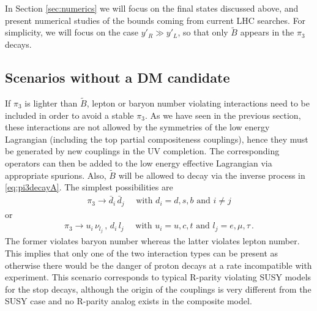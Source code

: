\documentclass[preprintnumbers,nofootinbib,showpacs,eqsecnum,pre,12pt]{revtex4-1}
\begin{document}
In Section \ref{sec:numerics} we will focus on the final states discussed above, and present numerical studies of the bounds coming from current LHC searches. For simplicity, we will focus on the case $y'_R \gg y'_L$, so that only $\tilde{B}$ appears in the $\pi_3$ decays.





\subsection{Scenarios without a DM candidate} 

If $\pi_3$ is lighter than $\tilde{B}$, lepton or baryon number violating interactions need to be included in order to avoid a stable $\pi_3$. As we have seen in the previous section, these interactions are not allowed by the symmetries of the low energy Lagrangian (including the top partial compositeness couplings), hence they must be generated by new couplings in the UV completion. The corresponding operators can then be added to the low energy effective Lagrangian via appropriate spurions. Also, $\tilde{B}$ will be allowed to decay via the inverse process in \cref{eq:pi3decayA}. 
The simplest possibilities are 
\begin{align} \label{eq:pi3decayBb}
\pi_3 \to \bar{d}_i \, \bar{d}_j \quad \text{ with } d_i = d,s,b \text{ and } i\ne j 
\end{align}  
or
\begin{align} \label{eq:pi3decayBl}
\pi_3 \to u_i \, \nu_{l_j} \,,\, d_i \, l_j \quad \text{ with } u_i = u,c,t \text{ and } 
l_j = e,\mu,\tau\,. 
\end{align}  
The former violates baryon number whereas the latter violates lepton number.
This implies that only one of the two interaction types can be present as otherwise there would be the danger of proton decays at a rate incompatible with experiment. This scenario corresponds to typical R-parity violating SUSY models for the stop decays, although the origin of the couplings is very different from the SUSY case and no R-parity analog exists in the composite model.
\end{document}
